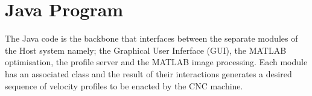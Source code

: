 \section{Java Program}
The Java code is the backbone that interfaces between the separate modules of the Host system namely; the Graphical User Inferface (GUI), the MATLAB\textsuperscript{\textregistered} optimisation, the profile server and the MATLAB\textsuperscript{\textregistered} image processing. Each module has an associated class and the result of their interactions generates a desired sequence of velocity profiles to be enacted by the CNC machine. 